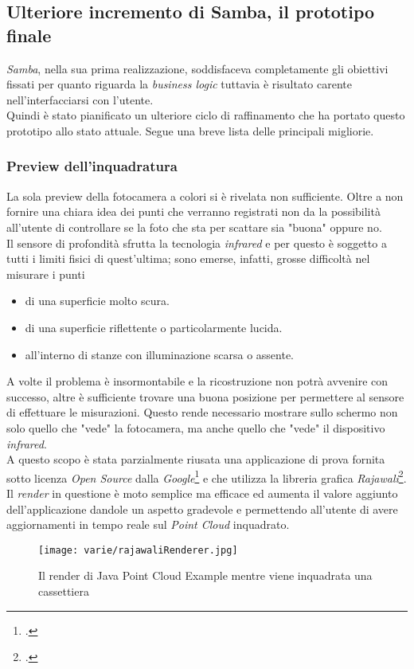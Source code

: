 \subsection{Ulteriore incremento di Samba, il prototipo finale}
\emph{Samba}, nella sua prima realizzazione, soddisfaceva completamente gli obiettivi fissati per quanto riguarda la \emph{business logic} tuttavia è risultato carente nell'interfacciarsi con l'utente.\\
Quindi è stato pianificato un ulteriore ciclo di raffinamento che ha portato questo prototipo allo stato attuale. Segue una breve lista delle principali migliorie.

\subsubsection{Preview dell'inquadratura}
La sola preview della fotocamera a colori si è rivelata non sufficiente. Oltre a non fornire una chiara idea dei punti che verranno registrati non da la possibilità all'utente di controllare se la foto che sta per scattare sia "buona" oppure no.\\
Il sensore di profondità sfrutta la tecnologia \emph{infrared} e per questo è soggetto a tutti i limiti fisici di quest'ultima; sono emerse, infatti, grosse difficoltà nel misurare i punti
\begin{itemize}
	\item di una superficie molto scura.
	\item di una superficie riflettente o particolarmente lucida.
	\item all'interno di stanze con illuminazione scarsa o assente.
\end{itemize}
A volte il problema è insormontabile e la ricostruzione non potrà avvenire con successo, altre è sufficiente trovare una buona posizione per permettere al sensore di effettuare le misurazioni. Questo rende necessario mostrare sullo schermo non solo quello che "vede" la fotocamera, ma anche quello che "vede" il dispositivo \emph{infrared}.\\
A questo scopo è stata parzialmente riusata una applicazione di prova fornita sotto licenza \emph{Open Source} dalla \emph{Google}\footcite{GitHub: https://github.com/googlesamples/tango-examples-java} e che utilizza la libreria grafica \emph{Rajawali}\footcite{GitHub: https://github.com/Rajawali/Rajawali}.\\
Il \emph{render} in questione è moto semplice ma efficace ed aumenta il valore aggiunto dell'applicazione dandole un aspetto gradevole e permettendo all'utente di avere aggiornamenti in tempo reale sul \emph{Point Cloud} inquadrato.
\begin{figure}[!h] 
    \centering 
    \texttt{[image: varie/rajawaliRenderer.jpg]} 
    \caption{Il render di Java Point Cloud Example mentre viene inquadrata una cassettiera}
\end{figure}



